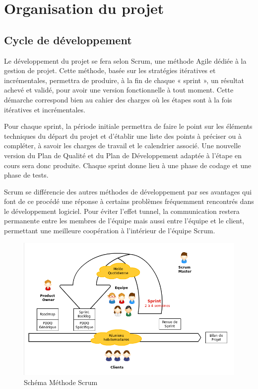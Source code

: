 \documentclass[10pt,a4paper]{article}
\begin{document}



\section{Organisation du projet}
\label{sec:organisation}

\subsection{Cycle de développement}

Le développement du projet se fera selon Scrum, une méthode Agile dédiée à la gestion de projet. Cette méthode, basée sur les stratégies itératives et incrémentales, permettra de produire, à la fin de chaque « sprint », un résultat achevé et validé, pour avoir une version fonctionnelle à tout moment. Cette démarche correspond bien au cahier des charges où les étapes sont à la fois itératives et incrémentales.

Pour chaque sprint, la période initiale permettra de faire le point sur les éléments techniques du départ du projet et d'établir une liste des points à préciser ou à compléter, à savoir les charges de travail et le calendrier associé. Une nouvelle version du Plan de Qualité et du Plan de Développement adaptée à l'étape en cours sera donc produite. Chaque sprint donne lieu à une phase de codage et une phase de tests.

Scrum se différencie des autres méthodes de développement par ses avantages qui font de ce procédé une réponse à certains problèmes fréquemment rencontrés dans le développement logiciel. Pour éviter l’effet tunnel, la communication restera permanente entre les membres de l’équipe mais aussi entre l’équipe et le client, permettant une meilleure coopération à l’intérieur de l’équipe Scrum. 

\begin{figure}
  \centering
\noindent\includegraphics[width=\textwidth]{scrum.png} 
  \caption{Schéma Méthode Scrum}
\end{figure}
\end{document}
